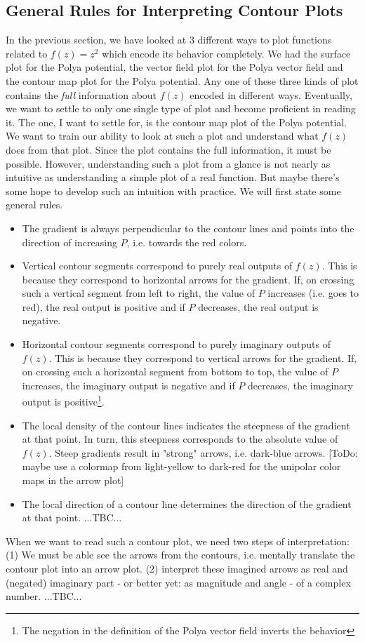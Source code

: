 \documentclass[12pt]{article}
\begin{document}
\subsection{General Rules for Interpreting Contour Plots}
In the previous section, we have looked at 3 different ways to plot functions related to $f(z) = z^2$ which encode its behavior completely. We had the surface plot for the Polya potential, the vector field plot for the Polya vector field and the contour map plot for the Polya potential. Any one of these three kinds of plot contains the \emph{full} information about $f(z)$ encoded in different ways. Eventually, we want to settle to only one single type of plot and become proficient in reading it. The one, I want to settle for, is the contour map plot of the Polya potential. We want to train our ability to look at such a plot and understand what $f(z)$ does from that plot. Since the plot contains the full information, it must be possible. However, understanding such a plot from a glance is not nearly as intuitive as understanding a simple plot of a real function. But maybe there's some hope to develop such an intuition with practice. We will first state some general rules.
\begin{itemize}
\item The gradient is always perpendicular to the contour lines and points into the direction of increasing $P$, i.e. towards the red colors.
\item Vertical contour segments correspond to purely real outputs of $f(z)$. This is because they correspond to horizontal arrows for the gradient. If, on crossing such a vertical segment from left to right, the value of $P$ increases (i.e. goes to red), the real output is positive and if $P$ decreases, the real output is negative.
\item Horizontal contour segments correspond to purely imaginary outputs of $f(z)$. This is because they correspond to vertical arrows for the gradient. If, on crossing such a horizontal segment from bottom to top, the value of $P$ increases, the imaginary output is negative and if $P$ decreases, the imaginary output is positive\footnote{The negation in the definition of the Polya vector field inverts the behavior}.
\item The local density of the contour lines indicates the steepness of the gradient at that point. In turn, this steepness corresponds to the absolute value of $f(z)$. Steep gradients result in "strong" arrows, i.e. dark-blue arrows. [ToDo: maybe use a colormap from light-yellow to dark-red for the unipolar color maps in the arrow plot]
\item The local direction of a contour line determines the direction of the gradient at that point. ...TBC...
\end{itemize}
When we want to read such a contour plot, we need two steps of interpretation: (1) We must be able see the arrows from the contours, i.e. mentally translate the contour plot into an arrow plot. (2) interpret these imagined arrows as real and (negated) imaginary part - or better yet: as magnitude and angle - of a complex number. ...TBC...
\end{document}
